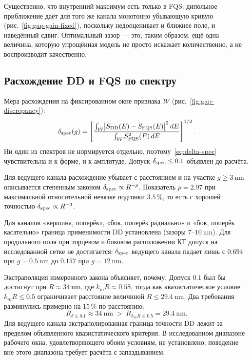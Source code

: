 Существенно, что внутренний максимум есть только в FQS: дипольное
приближение даёт для того же канала монотонно убывающую кривую
(рис.~\ref{fig:gap-gain-fixed}), поскольку недооценивает и ближнее поле, и
наведённый сдвиг. Оптимальный зазор — это, таким образом, ещё одна величина,
которую упрощённая модель не просто искажает количественно, а не воспроизводит
качественно.

\subsection{Расхождение DD и FQS по спектру}
\label{sec:res-discrepancy}

Мера расхождения на фиксированном окне признака $\mathcal W$ (рис.~\ref{fig:gap-discrepancy}):
\begin{equation}
  \delta_{\rm spec}(g) =
  \left[\frac{\int_{\mathcal W} \bigl|S_{\rm DD}(E) - S_{\rm FQS}(E)\bigr|^2\,dE}
             {\int_{\mathcal W} S_{\rm FQS}^2(E)\,dE}\right]^{1/2}.
  \label{eq:delta-spec}
\end{equation}
Ни один из спектров не нормируется отдельно, поэтому~\eqref{eq:delta-spec}
чувствительна и к форме, и к амплитуде. Допуск $\delta_{\rm spec}\le0.1$
объявлен до расчёта.

Для ведущего канала расхождение убывает с расстоянием и на участке
$g\ge\SI{3}{\nano\meter}$ описывается степенным законом
$\delta_{\rm spec}\propto R^{-p}$. Показатель $p=2.97$ при максимальной
относительной невязке подгонки $3.5\,\%$, то есть с хорошей точностью
$\delta_{\rm spec}\propto R^{-3}$.

Для каналов «вершина, поперёк», «бок, поперёк радиально» и
«бок, поперёк касательно» граница применимости DD установлена
(зазоры $7$--$\SI{10}{\nano\meter}$). Для продольного поля при торцевом
и боковом расположении КТ допуск на исследованной сетке не достигается:
$\delta_{\rm spec}$ ведущего канала падает лишь с $0.694$ при
$g=\SI{0.5}{\nano\meter}$ до $0.157$ при $g=\SI{12}{\nano\meter}$.

Экстраполяция измеренного закона объясняет, почему. Допуск $0.1$ был бы
достигнут при $R\approx\SI{34}{\nano\meter}$, где $k_m R\approx0.58$, тогда как
квазистатическое условие $k_m R\le0.5$ ограничивает расстояние величиной
$R\le\SI{29.4}{\nano\meter}$. Два требования разминулись примерно на $15\,\%$ по
расстоянию:
\begin{equation}
  R_{\delta\le0.1} \approx \SI{34}{\nano\meter}
  \;>\;
  R_{k_mR\le0.5} = \SI{29.4}{\nano\meter}.
  \label{eq:no-window}
\end{equation}
Для ведущего канала экстраполированная граница точности DD лежит за пределом
объявленного квазистатического критерия. В исследованном диапазоне рабочего
окна, удовлетворяющего обоим условиям, не установлено; поведение вне этого
диапазона требует расчёта с запаздыванием.

